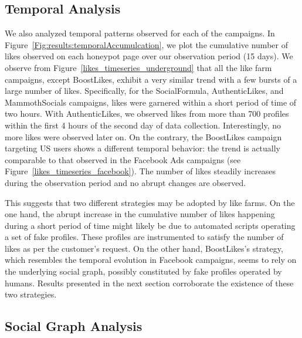 \documentclass[twocolumn,10pt,letterpaper]{article}
\begin{document}
\subsection{Temporal Analysis}
%
We also analyzed temporal patterns observed for each of the campaigns. In Figure~\ref{Fig:results:temporalAccumulcation}, we plot the cumulative number of likes observed on each honeypot page over our observation period (15 days). We observe from Figure~\ref{likes_timeseries_underground} that all the like farm campaigns, except BoostLikes, exhibit a very similar trend with a few bursts of a large number of likes. Specifically, for the SocialFormula, AuthenticLikes, and MammothSocials campaigns, likes were garnered within a short period of time of two hours. With AuthenticLikes, we observed likes from more than 700 profiles within the first 4 hours of the second day of data collection. Interestingly, no more likes were observed later on.
%
On the contrary, the BoostLikes campaign targeting US users shows a different temporal behavior: the trend is actually comparable to that observed in the Facebook Ads campaigns (see Figure~\ref{likes_timeseries_facebook}). The number of likes steadily increases during the observation period and no abrupt changes are observed.

This suggests that two different strategies may be adopted by like farms. On the one hand, the abrupt increase in the cumulative number of likes happening during a short period of time might likely be due to %
automated scripts operating a set of fake profiles. These profiles are instrumented to satisfy the number of likes as per the customer's request.
On the other hand, BoostLikes's strategy, which resembles the temporal evolution in Facebook campaigns,  seems to rely on the underlying social graph, possibly constituted by fake profiles operated by humans. Results presented in the next section corroborate the existence of these two strategies.



\subsection{Social Graph Analysis}
\end{document}
